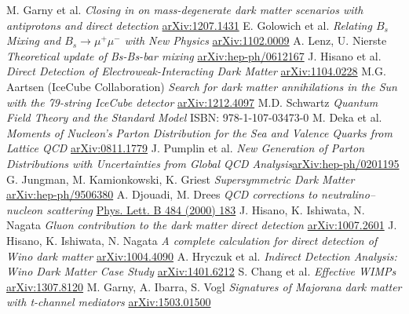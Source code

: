\documentclass[11pt,a4paper,twoside]{article}
\numberwithin{equation}{section}
\begin{document}
\begin{thebibliography}{xxx}
 M. Garny et al. \textit{Closing in on mass-degenerate dark matter scenarios with antiprotons and direct detection} \href{https://arxiv.org/abs/1207.1431}{arXiv:1207.1431}
 E. Golowich et al. \textit{Relating $B_s$ Mixing and $B_s \rightarrow \mu^+ \mu^-$ with New Physics} \href{https://arxiv.org/abs/1102.0009}{arXiv:1102.0009}
 A. Lenz, U. Nierste \textit{Theoretical update of Bs-Bs-bar mixing} \href{https://arxiv.org/abs/hep-ph/0612167}{arXiv:hep-ph/0612167}
  J. Hisano et al. \textit{Direct Detection of Electroweak-Interacting Dark Matter} \href{https://arxiv.org/abs/1104.0228v2}{arXiv:1104.0228}
 M.G. Aartsen (IceCube Collaboration) \textit{Search for dark matter annihilations in the Sun with the 79-string IceCube detector} \href{https://arxiv.org/abs/1212.4097}{arXiv:1212.4097}
 M.D. Schwartz \textit{Quantum Field Theory and the Standard Model} ISBN: 978-1-107-03473-0
 M. Deka et al. \textit{Moments of Nucleon's Parton Distribution for the Sea and Valence Quarks from Lattice QCD} \href{https://arxiv.org/abs/0811.1779}{arXiv:0811.1779}
 J. Pumplin et al. \textit{New Generation of Parton Distributions with Uncertainties from Global QCD Analysis}\href{https://arxiv.org/abs/hep-ph/0201195}{arXiv:hep-ph/0201195}
 G. Jungman, M. Kamionkowski, K. Griest \textit{Supersymmetric Dark Matter} \href{https://arxiv.org/abs/hep-ph/9506380}{arXiv:hep-ph/9506380}
 A. Djouadi, M. Drees \textit{QCD corrections to neutralino–nucleon scattering} \href{http://www.sciencedirect.com/science/journal/03702693/484}{Phys. Lett. B 484 (2000) 183}
 J. Hisano, K. Ishiwata, N. Nagata \textit{Gluon contribution to the dark matter direct detection}  \href{https://arxiv.org/abs/1007.2601}{arXiv:1007.2601}
 J. Hisano, K. Ishiwata, N. Nagata \textit{A complete calculation for direct detection of Wino dark matter}  \href{https://arxiv.org/abs/1004.4090}{arXiv:1004.4090}
 A. Hryczuk et al. \textit{Indirect Detection Analysis: Wino Dark Matter Case Study} \href{https://arxiv.org/abs/1401.6212v2}{arXiv:1401.6212}
 S. Chang et al. \textit{Effective WIMPs}  \href{https://arxiv.org/abs/1307.8120}{arXiv:1307.8120}
 M. Garny, A. Ibarra, S. Vogl \textit{Signatures of Majorana dark matter with t-channel mediators} \href{https://arxiv.org/abs/1503.01500}{arXiv:1503.01500}
\end{thebibliography}
\end{document}
